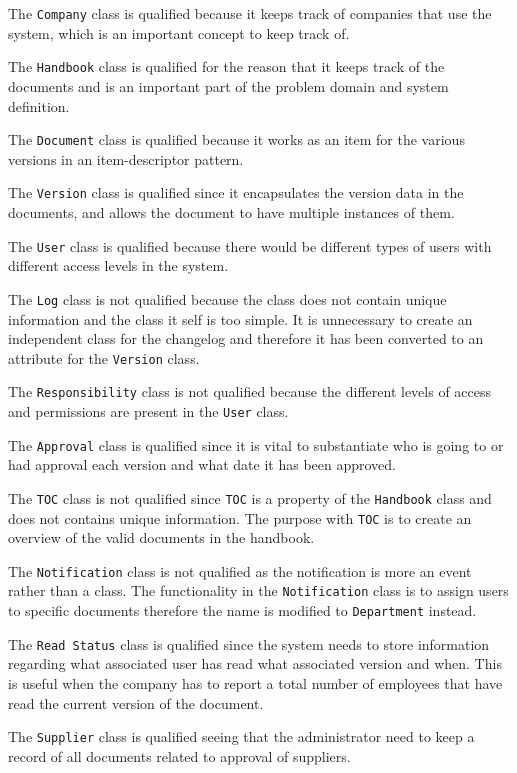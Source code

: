 The \texttt{Company} class is qualified because it keeps track of companies that use the system, which is an important concept to keep track of.

The \texttt{Handbook} class is qualified for the reason that it keeps track of the documents and is an important part of the problem domain and system definition.

The \texttt{Document} class is qualified because it works as an item for the various versions in an item-descriptor pattern.

The \texttt{Version} class is qualified since it encapsulates the version data in the documents, and allows the document to have multiple instances of them.

The \texttt{User} class is qualified because there would be different types of users with different access levels in the system.

The \texttt{Log} class is not qualified because the class does not contain unique information and the class it self is too simple.
It is unnecessary to create an independent class for the changelog and therefore it has been converted to an attribute for the \texttt{Version} class.

The \texttt{Responsibility} class is not qualified because the different levels of access and permissions are present in the \texttt{User} class.

The \texttt{Approval} class is qualified since it is vital to substantiate who is going to or had approval each version and what date it has been approved.

The \texttt{TOC} class is not qualified since \texttt{TOC} is a property of the \texttt{Handbook} class and does not contains unique information.
The purpose with \texttt{TOC} is to create an overview of the valid documents in the handbook.

The \texttt{Notification} class is not qualified as the notification is more an event rather than a class.
The functionality in the \texttt{Notification} class is to assign users to specific documents therefore the name is modified to \texttt{Department} instead.

The \texttt{Read Status} class is qualified since the system needs to store information regarding what associated user has read what associated version and when.
This is useful when the company has to report a total number of employees that have read the current version of the document.

The \texttt{Supplier} class is qualified seeing that the administrator need to keep a record of all documents related to approval of suppliers. 

